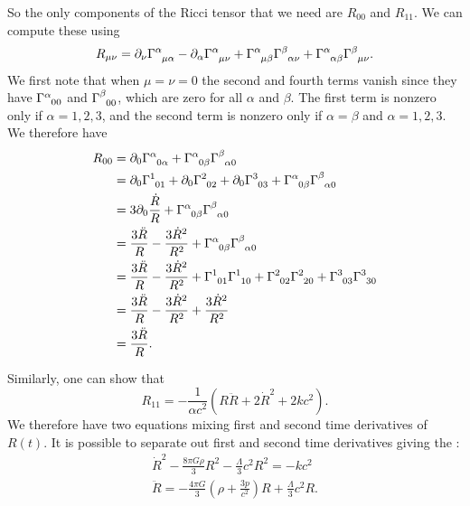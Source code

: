 \documentclass[fleqn]{NotesClass}
\newcommand*{\christoffel}[3]{\tensor{\Gamma}{^{#1}_{{#2}{#3}}}}
\begin{document}
    So the only components of the Ricci tensor that we need are \(R_{00}\) and \(R_{11}\).
    We can compute these using
    \begin{equation}
        R_{\mu\nu} = \partial_\nu \christoffel{\alpha}{\mu}{\alpha} - \partial_\alpha\christoffel{\alpha}{\mu}{\nu} + \christoffel{\alpha}{\mu}{\beta} \christoffel{\beta}{\alpha}{\nu} + \christoffel{\alpha}{\alpha}{\beta} \christoffel{\beta}{\mu}{\nu}.
    \end{equation}
    We first note that when \(\mu = \nu = 0\) the second and fourth terms vanish since they have \(\christoffel{\alpha}{0}{0}\) and \(\christoffel{\beta}{0}{0}\), which are zero for all \(\alpha\) and \(\beta\).
    The first term is nonzero only if \(\alpha = 1, 2, 3\), and the second term is nonzero only if \(\alpha = \beta\) and \(\alpha = 1, 2, 3\).
    We therefore have
    \begin{align}
        R_{00} &= \partial_0\christoffel{\alpha}{0}{\alpha} + \christoffel{\alpha}{0}{\beta}\christoffel{\beta}{\alpha}{0}\\
        &= \partial_0\christoffel{1}{0}{1} + \partial_0\christoffel{2}{0}{2} + \partial_0\christoffel{3}{0}{3} + \christoffel{\alpha}{0}{\beta}\christoffel{\beta}{\alpha}{0}\\
        &= 3\partial_0 \frac{\dot{R}}{R} + \christoffel{\alpha}{0}{\beta}\christoffel{\beta}{\alpha}{0}\\
        &= \frac{3\ddot{R}}{R} - \frac{3\dot{R}^2}{R^2} + \christoffel{\alpha}{0}{\beta}\christoffel{\beta}{\alpha}{0}\\
        &= \frac{3\ddot{R}}{R} - \frac{3\dot{R}^2}{R^2} + \christoffel{1}{0}{1}\christoffel{1}{1}{0} + \christoffel{2}{0}{2}\christoffel{2}{2}{0} + \christoffel{3}{0}{3}\christoffel{3}{3}{0}\\
        &= \frac{3\ddot{R}}{R} - \frac{3\dot{R}^2}{R^2} + \frac{3\dot{R}^2}{R^2}\\
        &= \frac{3\ddot{R}}{R}.
    \end{align}
    
    Similarly, one can show that
    \begin{equation}
        R_{11} = -\frac{1}{\alpha c^2}(R\ddot{R} + 2\dot{R}^2 + 2kc^2).
    \end{equation}
    We therefore have two equations mixing first and second time derivatives of \(R(t)\).
    It is possible to separate out first and second time derivatives giving the :
    \begin{gather}
        \dot{R}^2 - \frac{8\pi G\rho}{3}R^2 - \frac{\Lambda}{3}c^2R^2 = -kc^2\\
        \ddot{R} = -\frac{4\pi G}{3}\left( \rho + \frac{3p}{c^2} \right) R + \frac{\Lambda}{3}c^2R.
    \end{gather}
    
\end{document}
